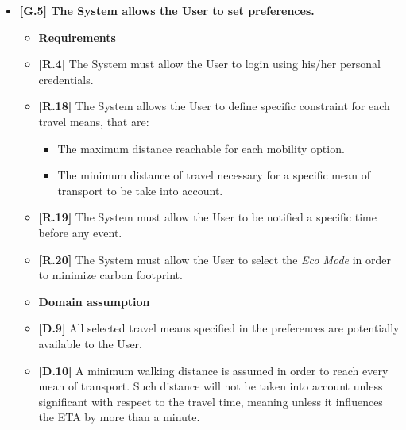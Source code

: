 \begin{itemize}
	\item \textbf{[G.5] The System allows the User to set preferences.}
	\begin{itemize}
		\item [] \textbf{Requirements}
		\item \textbf{[R.4]} The System must allow the User to login using his/her personal credentials.
		\item \textbf{[R.18]} The System allows the User to define specific constraint for each travel means, that are:
		\begin{itemize}
			\item The maximum distance reachable for each mobility option.
			\item The minimum distance of travel necessary for a specific mean of transport to be take into account.
		\end{itemize} 
		\item \textbf{[R.19]} The System must allow the User to be notified a specific time before any event.
		\item \textbf{[R.20]} The System must allow the User to select the \textit{Eco Mode} in order to minimize carbon footprint.
		\item [] \textbf{Domain assumption}
		\item \textbf{[D.9]} All selected travel means specified in the preferences are potentially available to the User.
		\item \textbf{[D.10]} A minimum walking distance is assumed in order to reach every mean of transport. Such distance will not be taken into account unless significant with respect to the travel time, meaning unless it influences the ETA by more than a minute.
	\end{itemize}


\end{itemize}
